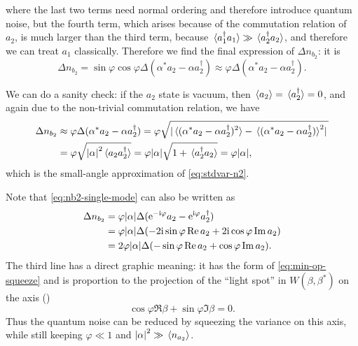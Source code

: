 \documentclass[hyperref, a4paper]{article}
\newcommand*{\ii}{\mathrm{i}}
\newcommand*{\ee}{\mathrm{e}}
\begin{document}
where the last two terms need normal ordering and therefore introduce quantum noise,
but the fourth term, which arises because of the commutation relation of $a_2$, 
is much larger than the third term,
because $\expval*{a_1^\dagger a_1} \gg \expval*{a_2^\dagger a_2}$,
and therefore we can treat $a_1$ classically.
Therefore we find the final expression of $\Delta n_{b_2}$: 
it is 
\begin{equation}
    \Delta n_{b_2} = \sin \varphi \cos \varphi \Delta (\alpha^* a_2 - \alpha a_2^\dagger)
    \approx \varphi \Delta (\alpha^* a_2 - \alpha a_2^\dagger).
    \label{eq:nb2-single-mode}
\end{equation}

We can do a sanity check:
if the $a_2$ state is vacuum,
then $\expval*{a_2} = \expval*{a_2^\dagger} = 0$, 
and again due to the non-trivial commutation relation, we have 
\begin{equation}
    \begin{aligned}
        \Delta n_{b_2} &\approx \varphi \Delta (\alpha^* a_2 - \alpha a_2^\dagger)
        = \varphi \sqrt{ \abs*{\expval*{ (\alpha^* a_2 - \alpha a_2^\dagger)^2 } 
        - \expval*{(\alpha^* a_2 - \alpha a_2^\dagger)}^2} } \\
        &= \varphi \sqrt{
            \abs{\alpha}^2 \expval*{a_2 a_2^\dagger}
        } 
        = \varphi \abs{\alpha} \sqrt{ 1 + \expval*{a^\dagger_2 a_2} } = \varphi \abs{\alpha},
    \end{aligned}
\end{equation}
which is the small-angle approximation of \eqref{eq:stdvar-n2}.

Note that \eqref{eq:nb2-single-mode} can also be written as  
\begin{equation}
    \begin{aligned}
        \Delta n_{b_2} &= \varphi \abs{\alpha} \Delta (\ee^{- \ii \varphi} a_2 - \ee^{\ii \varphi} a_2^\dagger)  \\
        &= \varphi \abs{\alpha} \Delta ( - 2 \ii \sin \varphi \Re a_2 + 2 \ii \cos \varphi \Im a_2 ) \\
        &= 2 \varphi \abs{\alpha} \Delta (- \sin \varphi \Re a_2 + \cos \varphi \Im a_2 ).
    \end{aligned}
    \label{eq:nb2-axis}
\end{equation}
The third line has a direct graphic meaning:
it has the form of \eqref{eq:min-op-squeeze}
and is proportion to the projection of the ``light spot'' in $W(\beta, \beta^*)$
on the axis ()
\begin{equation}
    \cos \varphi \Re \beta + \sin \varphi \Im \beta = 0.
    \label{eq:measure-axis}
\end{equation}
Thus the quantum noise can be reduced by squeezing the variance on this axis,
while still keeping $\varphi \ll 1$ and 
$\abs{\alpha}^2 \gg \expval*{n_{a_2}}$.
\end{document}
